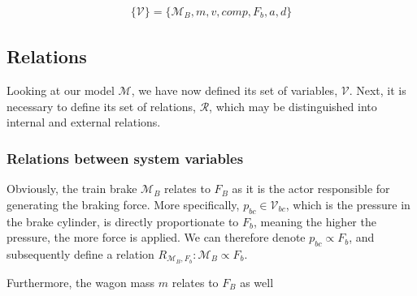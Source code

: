 \begin{align*}
\{ {\mathcal{V}} \} = \{ {\mathcal{M}}_{B},m,v,comp,F_{b},a,d \}
\end{align*}

\bigskip\noindent{}

\subsection{Relations}
\label{sec:Relations}
\par\noindent
Looking at our model ${\mathcal{M}}$, we have now defined its set of variables, ${\mathcal{V}}$. Next, it is necessary to define its set of relations, ${\mathcal{R}}$, which may be distinguished into internal and external relations.

\subsubsection{Relations between system variables}
\label{sec:RelationsSystemVariables}
\par\noindent
Obviously, the train brake ${\mathcal{M}}_{B}$ relates to $F_{B}$ as it is the actor responsible for generating the braking force. More specifically, $p_{bc} \in {\mathcal{V}}_{bc}$, which is the pressure in the brake cylinder, is directly proportionate to $F_{b}$, meaning the higher the pressure, the more force is applied. We can therefore denote $p_{bc} \propto F_{b}$, and subsequently define a relation $R_{{\mathcal{M}}_{B},F_{b}}: {\mathcal{M}}_{B} \propto F_{b}$.
\par
Furthermore, the wagon mass $m$ relates to $F_{B}$ as well

